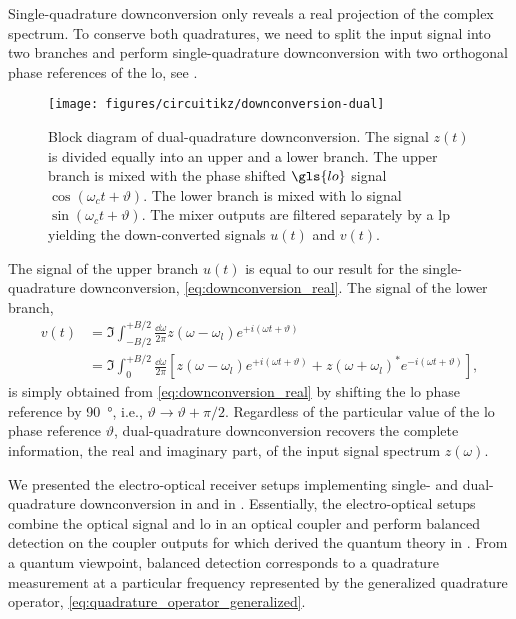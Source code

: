 Single-quadrature downconversion only reveals a real projection of the complex spectrum.
To conserve both quadratures, we need to split the input signal into two branches and perform single-quadrature downconversion with two orthogonal phase references of the \gls{lo}, see .
\begin{figure}[htb]
	\centering
	\texttt{[image: figures/circuitikz/downconversion-dual]}
	\caption{Block diagram of dual-quadrature downconversion. The signal $z(t)$ is divided equally into an upper and a lower branch. The upper branch is mixed with the phase shifted $\gls{lo}$ signal $\cos(\omega_ct+\vartheta)$. The lower branch is mixed with \gls{lo} signal $\sin(\omega_ct+\vartheta)$. The mixer outputs are filtered separately by a \gls{lp} yielding the down-converted signals $u(t)$ and $v(t)$.}\label{fig:downconversion_dual}
\end{figure}
The signal of the upper branch $u(t)$ is equal to our result for the single-quadrature downconversion, \cref{eq:downconversion_real}.
The signal of the lower branch,
\begin{equation}
	\begin{split}
		v(t)
		&=
		\Im
		\int_{-B/2}^{+B/2}\frac{\dd{\omega}}{2\pi}
		z(\omega-\omega_l)
		e^{+i(\omega t+\vartheta)}
		\\
		&=
		\Im
		\int_{0}^{+B/2}\frac{\dd{\omega}}{2\pi}
		\left[
			z(\omega-\omega_l)
			e^{+i(\omega t+\vartheta)}
			+
			z(\omega+\omega_l)^*
			e^{-i(\omega t+\vartheta)}
		\right]
		,
	\end{split}
	\label{eq:downconversion_imag}	
\end{equation}
is simply obtained from \cref{eq:downconversion_real} by shifting the \gls{lo} phase reference by \SI{90}{\degree}, i.e., $\vartheta\to\vartheta+\pi/2$.
Regardless of the particular value of the \gls{lo} phase reference $\vartheta$, dual-quadrature downconversion recovers the complete information, the real and imaginary part, of the input signal spectrum $z(\omega)$.

We presented the electro-optical receiver setups implementing single- and dual-quadrature downconversion in  and  in .
Essentially, the electro-optical setups combine the optical signal and \gls{lo} in an optical coupler and perform balanced detection on the coupler outputs for which derived the quantum theory in .
From a quantum viewpoint, balanced detection corresponds to a quadrature measurement at a particular frequency represented by the generalized quadrature operator, \cref{eq:quadrature_operator_generalized}.

